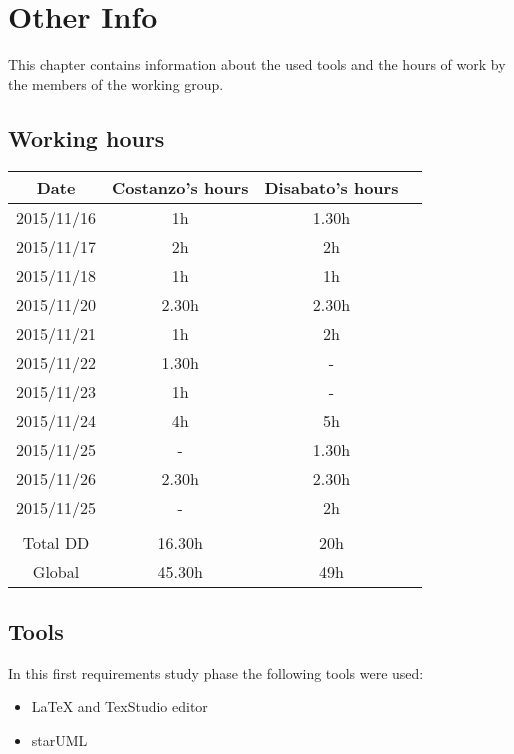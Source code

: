 \documentclass[\mainpath/main]{subfiles}
\begin{document}
\chapter{Other Info}
\label{other_info}

\setmyfancystyle

This chapter contains information about the used tools and the hours of work by the members of the working group.

\section{Working hours}
\begin{table}[h!]
\begin{tabular}{cccc}
\hline
Date & 		 Costanzo's hours & Disabato's hours  & \\ \hline
2015/11/16 & 1h 			  & 1.30h 			  & \\ \hline
2015/11/17 & 2h 			  & 2h 				  & \\ \hline 
2015/11/18 & 1h 			  & 1h 				  & \\ \hline
2015/11/20 & 2.30h 			  & 2.30h 			  & \\ \hline
2015/11/21 & 1h 			  & 2h 				  & \\ \hline
2015/11/22 & 1.30h 			  & - 				  & \\ \hline
2015/11/23 & 1h				  & -                 & \\ \hline
2015/11/24 & 4h				  & 5h				  & \\ \hline
2015/11/25 & -				  & 1.30h				  & \\ \hline
2015/11/26 & 2.30h				  & 2.30h				  & \\ \hline
2015/11/25 & -				  & 2h				  & \\ \hline
\\
Total DD   & 16.30h 			  & 20h 				  & \\ \hline
Global 	   & 45.30h 		  	  & 49h 			  & \\ \hline

\end{tabular}
\end{table}

\section{Tools}
In this first requirements study phase the following tools were used:
\begin{itemize}
	\item \LaTeX{} and TexStudio editor
	\item starUML
\end{itemize}
\end{document}
